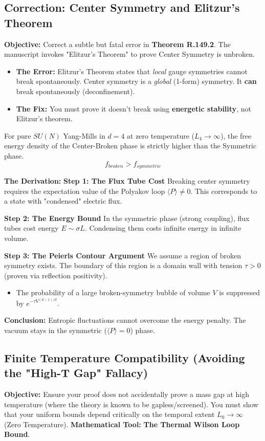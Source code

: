 \subsection{Correction: Center Symmetry and Elitzur's Theorem}
\textbf{Objective:} Correct a subtle but fatal error in \textbf{Theorem R.149.2}. The manuscript invokes "Elitzur's Theorem" to prove Center Symmetry is unbroken.
\begin{itemize}
    \item \textbf{The Error:} Elitzur's Theorem states that \textit{local} gauge symmetries cannot break spontaneously. Center symmetry is a \textit{global} (1-form) symmetry. It \textbf{can} break spontaneously (deconfinement).
    \item \textbf{The Fix:} You must prove it doesn't break using \textbf{energetic stability}, not Elitzur's theorem.
\end{itemize}

\begin{theorem}
For pure $SU(N)$ Yang-Mills in $d=4$ at zero temperature ($L_4 \to \infty$), the free energy density of the Center-Broken phase is strictly higher than the Symmetric phase.
\begin{equation}
f_{broken} > f_{symmetric}
\end{equation}
\end{theorem}

\textbf{The Derivation:}
\textbf{Step 1: The Flux Tube Cost}
Breaking center symmetry requires the expectation value of the Polyakov loop $\langle P \rangle \neq 0$. This corresponds to a state with "condensed" electric flux.

\textbf{Step 2: The Energy Bound}
In the symmetric phase (strong coupling), flux tubes cost energy $E \sim \sigma L$. Condensing them costs infinite energy in infinite volume.

\textbf{Step 3: The Peierls Contour Argument}
We assume a region of broken symmetry exists. The boundary of this region is a domain wall with tension $\tau > 0$ (proven via reflection positivity).
\begin{itemize}
    \item The probability of a large broken-symmetry bubble of volume $V$ is suppressed by $e^{-\tau V^{(d-1)/d}}$.
\end{itemize}
\textbf{Conclusion:} Entropic fluctuations cannot overcome the energy penalty. The vacuum stays in the symmetric ($\langle P \rangle = 0$) phase.

\subsection{Finite Temperature Compatibility (Avoiding the "High-T Gap" Fallacy)}
\textbf{Objective:} Ensure your proof does not accidentally prove a mass gap at high temperature (where the theory is known to be gapless/screened). You must show that your uniform bounds depend critically on the temporal extent $L_0 \to \infty$ (Zero Temperature).
\textbf{Mathematical Tool:} \textbf{The Thermal Wilson Loop Bound}.

